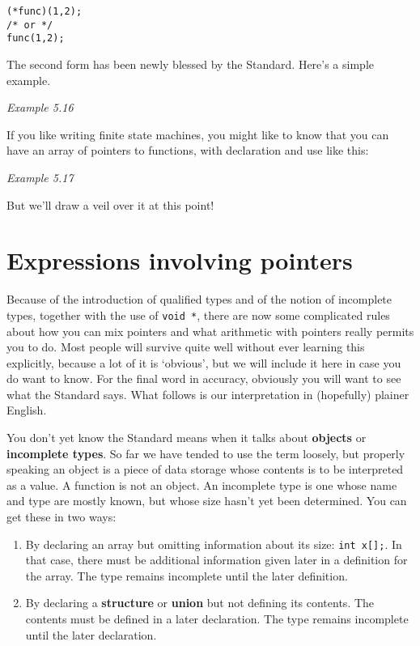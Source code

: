   \begin{Verbatim}
(*func)(1,2);
/* or */
func(1,2);
\end{Verbatim}

  The second form has been newly blessed by the Standard. Here's a simple
   example.


   \begin{center}\textit{Example 5.16}\end{center}


  If you like writing finite state machines, you might like to know that
   you can have an array of pointers to functions, with declaration and use
   like this:


   \begin{center}\textit{Example 5.17}\end{center}


  But we'll draw a veil over it at this point!


 
        \section{Expressions involving pointers}
        

  

  Because of the introduction of qualified types and of the notion of
   incomplete types, together with the use of \texttt{void *}, there are
   now some complicated rules about how you can mix pointers and what
   arithmetic with pointers really permits you to do. Most people will
   survive quite well without ever learning this explicitly, because a lot
   of it is `obvious', but we will include it here in case you do want
   to know. For the final word in accuracy, obviously you will want to see
   what the Standard says. What follows is our interpretation in (hopefully)
   plainer English.


  You don't yet know the Standard means when it talks about
   \textbf{objects} or \textbf{incomplete types}. So far we have tended
   to use the term loosely, but properly speaking an object is a piece of
   data storage whose contents is to be interpreted as a value. A function
   is not an object. An incomplete type is one whose name and type are
   mostly known, but whose size hasn't yet been determined. You can get
   these in two ways:


  \begin{enumerate}
   \item By declaring an array but omitting information about its size:
    \texttt{int x[];}. In that case, there must be additional
    information given later in a definition for the array. The type remains
    incomplete until the later definition.

   \item By declaring a \textbf{structure} or \textbf{union} but not
    defining its contents.  The contents must be defined in a later
    declaration. The type remains incomplete until the later declaration.
  \end{enumerate}

